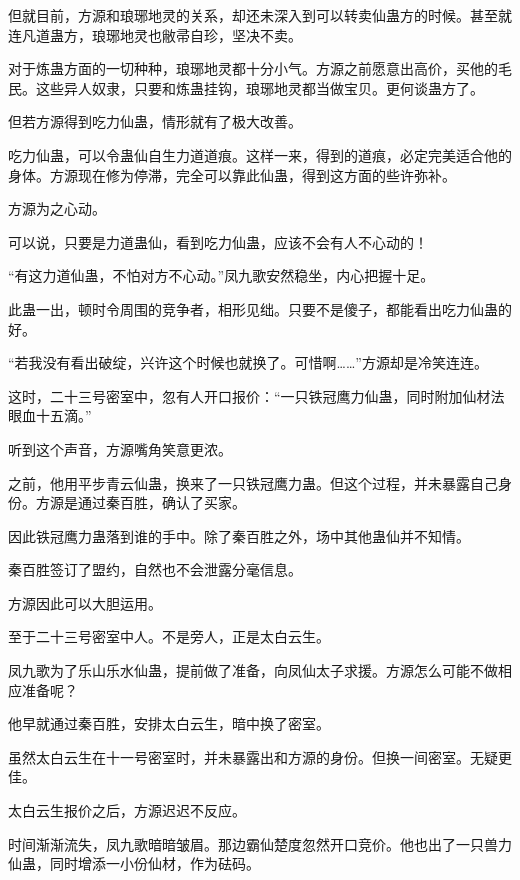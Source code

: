 
\begin{this_body}



但就目前，方源和琅琊地灵的关系，却还未深入到可以转卖仙蛊方的时候。甚至就连凡道蛊方，琅琊地灵也敝帚自珍，坚决不卖。

对于炼蛊方面的一切种种，琅琊地灵都十分小气。方源之前愿意出高价，买他的毛民。这些异人奴隶，只要和炼蛊挂钩，琅琊地灵都当做宝贝。更何谈蛊方了。

但若方源得到吃力仙蛊，情形就有了极大改善。

吃力仙蛊，可以令蛊仙自生力道道痕。这样一来，得到的道痕，必定完美适合他的身体。方源现在修为停滞，完全可以靠此仙蛊，得到这方面的些许弥补。

方源为之心动。

可以说，只要是力道蛊仙，看到吃力仙蛊，应该不会有人不心动的！

“有这力道仙蛊，不怕对方不心动。”凤九歌安然稳坐，内心把握十足。

此蛊一出，顿时令周围的竞争者，相形见绌。只要不是傻子，都能看出吃力仙蛊的好。

“若我没有看出破绽，兴许这个时候也就换了。可惜啊……”方源却是冷笑连连。

这时，二十三号密室中，忽有人开口报价：“一只铁冠鹰力仙蛊，同时附加仙材法眼血十五滴。”

听到这个声音，方源嘴角笑意更浓。

之前，他用平步青云仙蛊，换来了一只铁冠鹰力蛊。但这个过程，并未暴露自己身份。方源是通过秦百胜，确认了买家。

因此铁冠鹰力蛊落到谁的手中。除了秦百胜之外，场中其他蛊仙并不知情。

秦百胜签订了盟约，自然也不会泄露分毫信息。

方源因此可以大胆运用。

至于二十三号密室中人。不是旁人，正是太白云生。

凤九歌为了乐山乐水仙蛊，提前做了准备，向凤仙太子求援。方源怎么可能不做相应准备呢？

他早就通过秦百胜，安排太白云生，暗中换了密室。

虽然太白云生在十一号密室时，并未暴露出和方源的身份。但换一间密室。无疑更佳。

太白云生报价之后，方源迟迟不反应。

时间渐渐流失，凤九歌暗暗皱眉。那边霸仙楚度忽然开口竞价。他也出了一只兽力仙蛊，同时增添一小份仙材，作为砝码。


\end{this_body}
